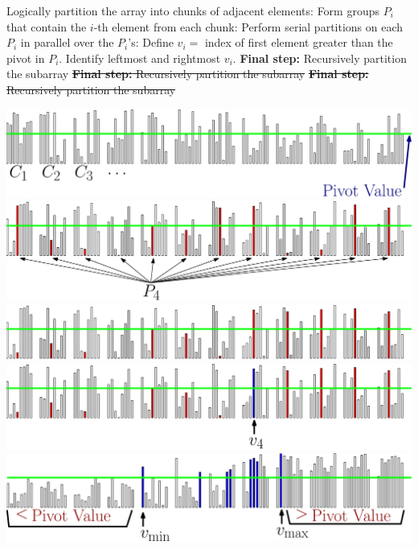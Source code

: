 \documentclass[xcolor=x11names, svgnames, rgb]{beamer}
\begin{document}
\begin{frame}[t]{}%
	\vspace{0.25cm}
	\begin{overprint}
	Logically partition the array into chunks of adjacent elements:
	\onslide<2>Form groups $P_i$ that contain the $i$-th element from each chunk:
	\onslide<3>Perform serial partitions on each $P_i$ in parallel over the $P_i$'s:
	\onslide<4>Define $v_i=$ index of first element greater than the pivot in $P_i$. 
	\onslide<5>Identify leftmost and rightmost $v_i$.  
	\onslide<6> \textbf{Final step:} Recursively partition the subarray
	\onslide<7> \st{\textbf{Final step:} Recursively partition the subarray}  
	\onslide<8> \st{\textbf{Final step:} Recursively partition the subarray}  
	\end{overprint}
	\vspace{0.25cm}
	\begin{overprint}
	\includegraphics[width=\linewidth]{imgs/stridedAlgSim/stridedAlgSim_1.eps}
	\onslide<2>\includegraphics[width=\linewidth]{imgs/stridedAlgSim/stridedAlgSim_2.eps}
	\onslide<3>\includegraphics[width=\linewidth]{imgs/stridedAlgSim/stridedAlgSim_3.eps}
	\onslide<4>\includegraphics[width=\linewidth]{imgs/stridedAlgSim/stridedAlgSim_35.eps}
	\onslide<5>\includegraphics[width=\linewidth]{imgs/stridedAlgSim/stridedAlgSim_4.eps}

\end{overprint}
\end{frame}
\end{document}
